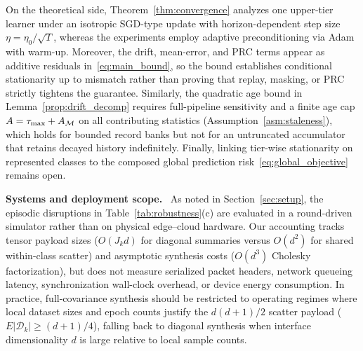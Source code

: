 On the theoretical side, Theorem~\ref{thm:convergence} analyzes one upper-tier learner under an isotropic SGD-type update with horizon-dependent step size $\eta=\eta_0/\sqrt{T}$, whereas the experiments employ adaptive preconditioning via Adam with warm-up. Moreover, the drift, mean-error, and PRC terms appear as additive residuals in~\eqref{eq:main_bound}, so the bound establishes conditional stationarity up to mismatch rather than proving that replay, masking, or PRC strictly tightens the guarantee. Similarly, the quadratic age bound in Lemma~\ref{prop:drift_decomp} requires full-pipeline sensitivity and a finite age cap $A=\tau_{\max}+A_{\mathcal M}$ on all contributing statistics (Assumption~\ref{asm:staleness}), which holds for bounded record banks but not for an untruncated accumulator that retains decayed history indefinitely. Finally, linking tier-wise stationarity on represented classes to the composed global prediction risk~\eqref{eq:global_objective} remains open.

\noindent\textbf{Systems and deployment scope.}~
As noted in Section~\ref{sec:setup}, the episodic disruptions in Table~\ref{tab:robustness}(c) are evaluated in a round-driven simulator rather than on physical edge--cloud hardware. Our accounting tracks tensor payload sizes ($O(J_k d)$ for diagonal summaries versus $O(d^2)$ for shared within-class scatter) and asymptotic synthesis costs ($O(d^3)$ Cholesky factorization), but does not measure serialized packet headers, network queueing latency, synchronization wall-clock overhead, or device energy consumption. In practice, full-covariance synthesis should be restricted to operating regimes where local dataset sizes and epoch counts justify the $d(d+1)/2$ scatter payload ($E|\mathcal D_k| \ge (d+1)/4$), falling back to diagonal synthesis when interface dimensionality $d$ is large relative to local sample counts.